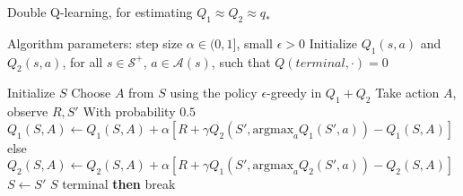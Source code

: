 \documentclass[12pt]{article}
\newcommand{\<}{\langle}
\renewcommand{\>}{\rangle}
\renewcommand{\S}{\mathcal{S}}
\newcommand{\A}{\mathcal{A}}
\begin{document}
\begin{algorithm}
\caption{Double Q-learning, for estimating $Q_1 \approx Q_2 \approx q_*$}
\begin{algorithmic}
\State Algorithm parameters: step size $\alpha\in (0,1]$, small $\epsilon > 0$
\State Initialize $Q_1(s, a)$ and $Q_2(s, a)$, for all $s\in\S^+$, $a\in\A(s)$, such that $Q(terminal, \cdot)=0$

\medskip
{}
  \State Initialize $S$
    \State Choose $A$ from $S$ using the policy $\epsilon$-greedy in $Q_1 + Q_2$
    \State Take action $A$, observe $R,S'$
    \State With probability $0.5$
    \State \quad $Q_1(S,A)\leftarrow Q_1(S,A) + \alpha [ R + \gamma Q_2(S',\mathrm{argmax}_a Q_1(S',a)) - Q_1(S,A) ]$
    \State else
    \State \quad $Q_2(S,A)\leftarrow Q_2(S,A) + \alpha [ R + \gamma Q_1(S',\mathrm{argmax}_a Q_2(S',a)) - Q_2(S,A) ]$
    \State $S\leftarrow S'$
     $S$ terminal {\bf then} break
  \EndFor
\EndFor
\end{algorithmic}
\end{algorithm}





\begin{thebibliography}{10}
\end{thebibliography}
\end{document}

